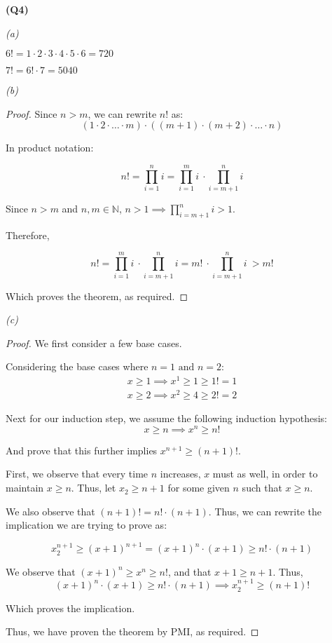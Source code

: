 \documentclass[12pt, a4paper]{article}
\newcommand{\N}{\mathbb{N}}
\renewcommand{\times}{\cdot}
\begin{document}
\noindent\textbf{(Q4)}

\noindent\textit{(a)}

$6! = 1 \cdot 2 \cdot 3 \cdot 4 \cdot 5 \cdot 6 = 720$

$7! = 6! \cdot 7 = 5040$

\noindent\textit{(b)}

\begin{proof}
    Since $n > m$, we can rewrite $n!$ as:
    \[
        (1 \times 2 \times \ldots \times m) \times ((m + 1) \times (m + 2) \times \ldots \times n)
    \]

    In product notation:

    \[
        n! = \prod_{i = 1}^{n} i = \prod_{i = 1}^{m} i \: \cdot \prod_{i = m + 1}^{n} i
    \]

    Since $n > m$ and $n, m \in \N$, $n > 1 \implies \displaystyle\prod_{i = m + 1}^{n} i > 1$.

    Therefore,

    \[
        n! = \prod_{i = 1}^{m} i \: \cdot \prod_{i = m + 1}^{n} i = m! \: \cdot \prod_{i = m + 1}^{n} i \: > m!
    \]

    Which proves the theorem, as required.
\end{proof}

\noindent\textit{(c)}

\begin{proof}
    We first consider a few base cases.

    Considering the base cases where $n = 1 \text{ and } n = 2$:
    \begin{gather*}
        x \geq 1 \implies x^1 \geq 1 \geq 1! = 1\\
        x \geq 2 \implies x^2 \geq 4 \geq 2! = 2
    \end{gather*}

    Next for our induction step, we assume the following induction hypothesis:
    \[
        x \geq n \implies x^n \geq n!
    \]

    And prove that this further implies $x^{n + 1} \geq (n + 1)!$.

    First, we observe that every time $n$ increases, $x$ must as well, in order to
    maintain $x \geq n$. Thus, let $x_2 \geq n + 1$ for some given $n$ such that $x \geq n$.

    We also observe that $(n + 1)! = n! \cdot (n + 1)$. Thus, we can rewrite the implication
    we are trying to prove as:

    \[
        x_2^{n + 1} \geq (x + 1)^{n + 1} = (x + 1)^n \cdot (x + 1) \geq n! \cdot (n + 1)
    \]

    We observe that $(x + 1)^n \geq x^n \geq n!$, and that 
    $x + 1 \geq n + 1$. Thus,
    \[
        (x + 1)^n \cdot (x + 1) \geq n! \cdot (n + 1) \implies x_2^{n + 1} \geq (n + 1)!
    \]

    Which proves the implication.

    Thus, we have proven the theorem by PMI, as required.
\end{proof}
\end{document}
